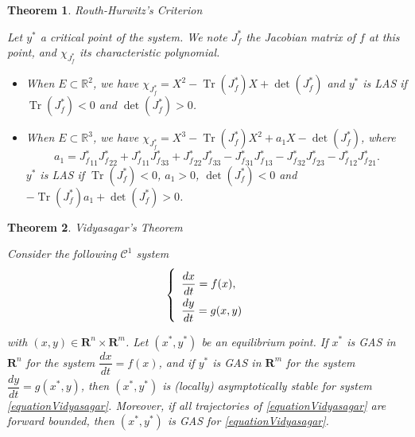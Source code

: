 \documentclass{article}
\DeclareMathOperator{\Tr}{Tr}
\newtheorem{theorem}{Theorem}
\begin{document}
\begin{theorem} Routh-Hurwitz's Criterion \label{theorem:Routh-Hurwitz}

Let $y^*$ a critical point of the system. We note $J_f^*$ the Jacobian matrix of $f$ at this point, and $\chi_{J_f^*}$ its characteristic polynomial.

\begin{itemize}
\item When $E\subset \mathbb{R}^2$, we have $\chi_{J_f^*} = X^2 - \Tr(J_f^*) X + \det(J_f^*)$ and $y^*$ is LAS if $\Tr(J_f^*) < 0$ and $\det(J_f^*) > 0$.
\item When $E\subset \mathbb{R}^3$, we have $\chi_{J_f^*} = X^3 - \Tr(J_f^*) X^2 + a_1 X - \det(J_f^*)$, where $$a_1 = J{_f^*}_{11}J{_f^*}_{22} + J{_f^*}_{11} J{_f^*}_{33} + J{_f^*}_{22}J{_f^*}_{33} - J{_f^*}_{31}J{_f^*}_{13} - J{_f^*}_{32}J{_f^*}_{23} - J{_f^*}_{12}J{_f^*}_{21}.$$  $y^*$ is LAS if $\Tr(J_f^*) < 0$, $a_1 > 0$, $\det(J_f^*) < 0$ and $-\Tr(J_f^*) a_1 + \det(J_f^*) > 0$.
\end{itemize}
\end{theorem}

\begin{theorem} Vidyasagar's Theorem \label{theorem:Vidyasagar} \cite{vidyasagar_decomposition_1980, dumont_mathematical_2012}

Consider the following $\mathcal{C}^1$ system
\begin{equation}
\def\arraystretch{2}
\left\{ \begin{array}{l}
\dfrac{dx}{dt} = f(x), \\
\dfrac{dy}{dt} = g(x, y) 
\end{array} \right.
\label{equationVidyasagar}
\end{equation}

with $(x, y) \in \mathbf{R}^n \times\mathbf{R}^m$. Let $(x^*, y^*)$ be an equilibrium point.
If $x^*$ is GAS in $\mathbf{R}^n$ for the system $\dfrac{dx}{dt} = f(x)$, and if $y^*$ is GAS in $\mathbf{R}^m$ for the system $\dfrac{dy}{dt} = g(x^*, y)$, then $(x^*, y^*)$ is (locally) asymptotically stable for system \eqref{equationVidyasagar}. Moreover, if all trajectories of \eqref{equationVidyasagar} are forward bounded, then $(x^*, y^*)$ is GAS for \eqref{equationVidyasagar}.
\end{theorem}
\end{document}

